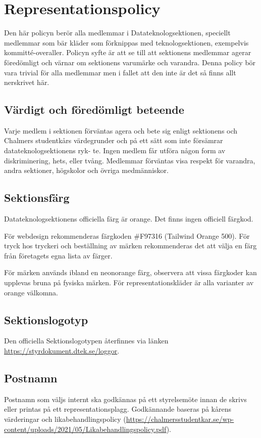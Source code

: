 \section{Representationspolicy}
Den här policyn berör alla medlemmar i Datateknologsektionen, speciellt medlemmar som
bär kläder som förknippas med teknologsektionen, exempelvis kommitté-overaller. Policyn
syfte är att se till att sektionens medlemmar agerar föredömligt och värnar om sektionens
varumärke och varandra. Denna policy bör vara trivial för alla medlemmar men i fallet att
den inte är det så finns allt nerskrivet här.

\subsection{Värdigt och föredömligt beteende}
Varje medlem i sektionen förväntas agera och bete sig enligt sektionens och Chalmers
studentkårs värdegrunder och på ett sätt som inte försämrar datateknologsektionens ryk-
te. Ingen medlem får utföra någon form av diskriminering, hets, eller tvång. Medlemmar
förväntas visa respekt för varandra, andra sektioner, högskolor och övriga medmänniskor.

\subsection{Sektionsfärg}

Datateknologsektionens officiella färg är orange. Det finns ingen officiell färgkod.

För webdesign rekommenderas färgkoden \#F97316 (Tailwind Orange 500). För tryck hos tryckeri och beställning av märken rekommenderas det att välja en färg från företagets egna lista av färger. 
 
För märken används ibland en neonorange färg, observera att vissa färgkoder kan upplevas bruna på fysiska märken. För representationskläder är alla varianter av orange välkomna. 

\subsection{Sektionslogotyp}
Den officiella Sektionslogotypen återfinnes via länken \url{https://styrdokument.dtek.se/loggor}.

\subsection{Postnamn}
Postnamn som väljs internt ska godkännas på ett styrelsemöte innan de skrivs eller printas
på ett representationsplagg. Godkännande baseras på kårens värderingar och likabehandlingspolicy
(\url{https://chalmersstudentkar.se/wp-content/uploads/2021/05/Likabehandlingspolicy.pdf}).